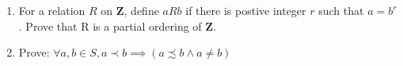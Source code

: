 \documentclass{article}
\begin{document}
\begin{enumerate}
  \item For a relation $R$ on $\mathbf{Z}$,
  define $aRb$ if there is postive integer $r$ such that $a = b^r$.
  Prove that R is a partial ordering of $\mathbf{Z}$.

  \item Prove:
  $
  \forall a, b \in S, a\prec b \implies (a\precsim b \land a \neq b)
  $

\end{enumerate}
\end{document}
